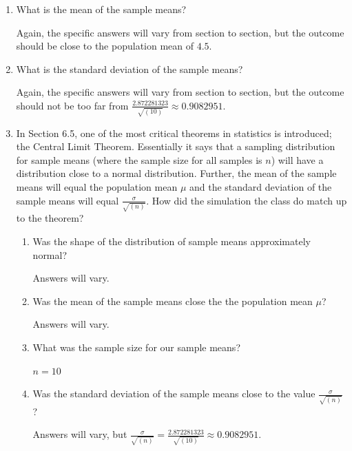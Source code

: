 \documentclass{article}
\newcommand{\answer}[1]{\color{white}#1}
\begin{document}
\begin{enumerate}
\begin{enumerate}
{\answer This will certainly vary from section to section, but the distributions should be roughly single-mound, symmetric.
} 

\item What is the mean of the sample means? 

{\answer Again, the specific answers will vary from section to section, but the outcome should be close to the population mean of $4.5$.
} 

\item What is the standard deviation of the sample means? 

{\answer Again, the specific answers will vary from section to section, but the outcome should not be too far from $\frac{2.872281323}{\sqrt{(10)}} \approx 0.9082951$.
} 

\item In Section 6.5, one of the most critical theorems in statistics is introduced; the Central Limit Theorem. Essentially it says that a sampling distribution for sample means (where the sample size for all samples is $n$) will have a distribution close to a normal distribution. Further, the mean of the sample means will equal the population mean $\mu$ and the standard deviation of the sample means will equal $\frac{\sigma}{\sqrt{(n)}}$. How did the simulation the class do match up to the theorem? 

	\begin{enumerate}
	
	\item Was the shape of the distribution of sample means approximately normal? 
	
	{\answer Answers will vary.
	} 
	
	\item Was the mean of the sample means close the the population mean $\mu$? 
	
	{\answer Answers will vary.
	} 
	
	\item What was the sample size for our sample means? 
	
	{\answer $n = 10$ 
	} 
	
	\item Was the standard deviation of the sample means close to the value $\frac{\sigma}{\sqrt{(n)}}$? 
	
	{\answer Answers will vary, but $\frac{\sigma}{\sqrt{(n)}} = \frac{2.872281323}{\sqrt{(10)}} \approx 0.9082951$.
	} 
	
	\end{enumerate}
	


\end{enumerate}
\end{enumerate}
\end{document}
